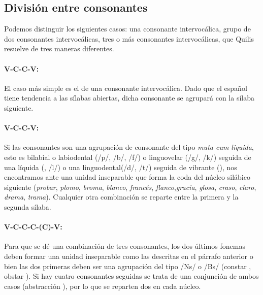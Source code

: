 \subsection{División entre consonantes}
Podemos distinguir los siguientes casos: una consonante intervocálica, grupo de dos consonantes intervocálicas, tres o más consonantes intervocálicas, que Quilis~\parencite*[367-369]{quilis2019} resuelve de tres maneras diferentes.

\paragraph{V-C-C-V:}{El caso más simple es el de una consonante intervocálica. Dado que el español tiene tendencia a las sílabas abiertas, dicha consonante se agrupará con la sílaba siguiente.}


\paragraph{V-C-C-V:}{Si las consonantes son una agrupación de consonante del tipo \textit{muta cum liquida}, esto es bilabial o labiodental (/p/, /b/, /f/) o linguovelar (/g/, /k/) seguida de una líquida (, /l/) o una linguodental(/d/, /t/) seguida de vibrante (), nos encontramos ante una unidad inseparable que forma la coda del núcleo silábico siguiente (\textit{probar}, \textit{plomo}, \textit{broma}, \textit{blanco}, \textit{francés}, \textit{flanco},\textit{gracia}, \textit{glosa}, \textit{craso},  \textit{claro},  \textit{drama},  \textit{trama}). Cualquier otra combinación se reparte entre la primera y la segunda sílaba.}

\paragraph{V-C-C-C-(C)-V:}{Para que se dé una combinación de tres consonantes, los dos últimos fonemas deben formar una unidad inseparable como las descritas en el párrafo anterior o bien las dos primeras deben ser una agrupación del tipo /Ns/ o /Bs/ (\textlangle{}constar\textrangle{} , \textlangle{}obstar\textrangle{} ). Si hay cuatro consonantes seguidas se trata de una conjunción de ambos casos (\textlangle{}abstracción\textrangle{} ), por lo que se reparten dos en cada núcleo.}

